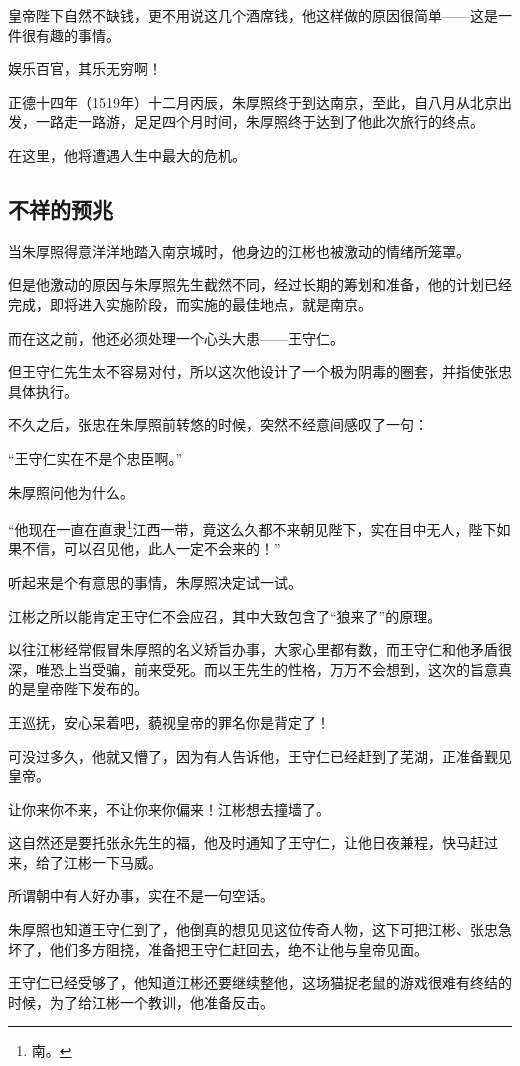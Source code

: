 \begin{multicols}{\theparacolNo}
皇帝陛下自然不缺钱，更不用说这几个酒席钱，他这样做的原因很简单——这是一件很有趣的事情。

娱乐百官，其乐无穷啊！

正德十四年（1519年）十二月丙辰，朱厚照终于到达南京，至此，自八月从北京出发，一路走一路游，足足四个月时间，朱厚照终于达到了他此次旅行的终点。

在这里，他将遭遇人生中最大的危机。

\subsection{不祥的预兆}
当朱厚照得意洋洋地踏入南京城时，他身边的江彬也被激动的情绪所笼罩。

但是他激动的原因与朱厚照先生截然不同，经过长期的筹划和准备，他的计划已经完成，即将进入实施阶段，而实施的最佳地点，就是南京。

而在这之前，他还必须处理一个心头大患——王守仁。

但王守仁先生太不容易对付，所以这次他设计了一个极为阴毒的圈套，并指使张忠具体执行。

不久之后，张忠在朱厚照前转悠的时候，突然不经意间感叹了一句：

“王守仁实在不是个忠臣啊。”

朱厚照问他为什么。

“他现在一直在直隶\footnote{南。}江西一带，竟这么久都不来朝见陛下，实在目中无人，陛下如果不信，可以召见他，此人一定不会来的！”

听起来是个有意思的事情，朱厚照决定试一试。

江彬之所以能肯定王守仁不会应召，其中大致包含了“狼来了”的原理。

以往江彬经常假冒朱厚照的名义矫旨办事，大家心里都有数，而王守仁和他矛盾很深，唯恐上当受骗，前来受死。而以王先生的性格，万万不会想到，这次的旨意真的是皇帝陛下发布的。

王巡抚，安心呆着吧，藐视皇帝的罪名你是背定了！

可没过多久，他就又懵了，因为有人告诉他，王守仁已经赶到了芜湖，正准备觐见皇帝。

让你来你不来，不让你来你偏来！江彬想去撞墙了。

这自然还是要托张永先生的福，他及时通知了王守仁，让他日夜兼程，快马赶过来，给了江彬一下马威。

所谓朝中有人好办事，实在不是一句空话。

朱厚照也知道王守仁到了，他倒真的想见见这位传奇人物，这下可把江彬、张忠急坏了，他们多方阻挠，准备把王守仁赶回去，绝不让他与皇帝见面。

王守仁已经受够了，他知道江彬还要继续整他，这场猫捉老鼠的游戏很难有终结的时候，为了给江彬一个教训，他准备反击。


\end{multicols}
